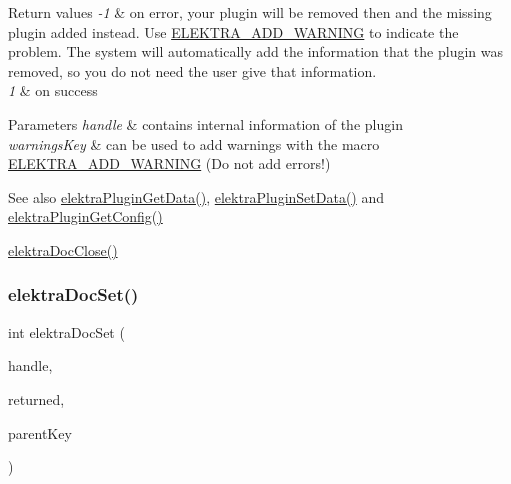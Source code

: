 \begin{DoxyRetVals}{Return values}
{\em -\/1} & on error, your plugin will be removed then and the missing plugin added instead. Use \hyperlink{group__plugin_ga3da3bdb0f41710adda9eee3d7adac9ff}{E\+L\+E\+K\+T\+R\+A\+\_\+\+A\+D\+D\+\_\+\+W\+A\+R\+N\+I\+NG} to indicate the problem. The system will automatically add the information that the plugin was removed, so you do not need the user give that information.\\
\hline
{\em 1} & on success\\
\hline
\end{DoxyRetVals}

\begin{DoxyParams}{Parameters}
{\em handle} & contains internal information of the plugin \\
\hline
{\em warnings\+Key} & can be used to add warnings with the macro \hyperlink{group__plugin_ga3da3bdb0f41710adda9eee3d7adac9ff}{E\+L\+E\+K\+T\+R\+A\+\_\+\+A\+D\+D\+\_\+\+W\+A\+R\+N\+I\+NG} (Do not add errors!) \\
\hline
\end{DoxyParams}
\begin{DoxySeeAlso}{See also}
\hyperlink{group__plugin_gaafcf3216b46292f222b8cc7828b4dd20}{elektra\+Plugin\+Get\+Data()}, \hyperlink{group__plugin_gaf4b941a52ff55d0ca2a9158d90208ef2}{elektra\+Plugin\+Set\+Data()} and \hyperlink{group__plugin_ga644bead796506c172817724051c977c9}{elektra\+Plugin\+Get\+Config()} 

\hyperlink{group__plugin_ga1236aefe5b2baf8b7bf636ba5aa9ea29}{elektra\+Doc\+Close()} 
\end{DoxySeeAlso}
\mbox{\label{group__plugin_gae65781a1deb34efc79c8cb9d9174842c}} 
\subsubsection{\texorpdfstring{elektra\+Doc\+Set()}{elektraDocSet()}}
{\footnotesize\ttfamily int elektra\+Doc\+Set (\begin{DoxyParamCaption}\item[{Plugin $\ast$}]{handle,  }\item[{Key\+Set $\ast$}]{returned,  }\item[{Key $\ast$}]{parent\+Key }\end{DoxyParamCaption})}



